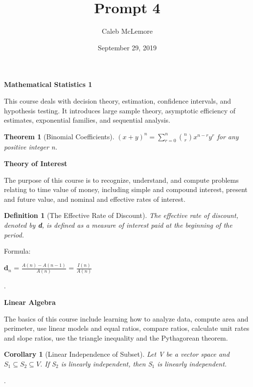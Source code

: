 \documentclass[12pt]{article}
\title{Prompt 4}
\author{Caleb McLemore}
\date{September 29, 2019}
\newtheorem{thm}{Theorem}
\newtheorem{dfn}{Definition}
\newtheorem{cor}{Corollary}
\begin{document}
\maketitle
\newpage


\begin{center}
    \textbf{Mathematical Statistics 1}
\end{center}
This course deals with decision theory, estimation, confidence intervals, and hypothesis testing. It introduces large sample theory, asymptotic efficiency of estimates, exponential families, and sequential analysis.
\begin{thm}[Binomial Coefficients]
\((x+y)^{n} = \sum_{r=0}^{n} {{n}\choose{r}} x^{n-r} y^{r}\) for any positive integer n.
\end{thm}

\cite{miller2004john}

\begin{center}
    \textbf{Theory of Interest}
\end{center}
The purpose of this course is to recognize, understand, and compute problems relating to time value of money, including simple and compound interest, present and future value, and nominal and effective rates of interest.
\begin{dfn}[The Effective Rate of Discount]
The effective rate of discount, denoted by \textbf{d}, is defined as a measure of interest paid at the beginning of the period.
\end{dfn}
Formula:
\begin{center}
    \textbf{d\(_n\)} = \(\frac{A(n)-A(n-1)}{A(n)}\) = \(\frac{I(n)}{A(n)}\)
\end{center}

\cite{kellison1991stephen}.

\begin{center}
    \textbf{Linear Algebra}
\end{center}
The basics of this course include learning how to analyze data, compute area and perimeter, use linear models and equal ratios, compare ratios, calculate unit rates and slope ratios, use the triangle inequality and the Pythagorean theorem.
\begin{cor}[Linear Independence of Subset] 
Let V be a vector space and \(S_1 \subseteq{S_2} \subseteq{V}\). If S\(_2\) is linearly independent, then S\(_1\) is linearly independent.
\end{cor}

\cite{lay2015david}.




\end{document}
